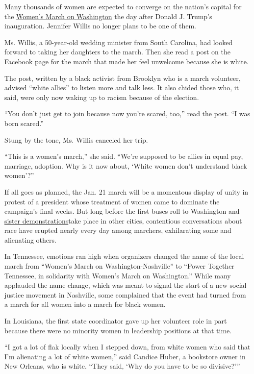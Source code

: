Many thousands of women are expected to converge on the nation's capital
for the
\href{https://www.nytimes.com/2016/11/19/us/womens-march-on-washington.html}{Women's
March on Washington} the day after Donald J. Trump's inauguration.
Jennifer Willis no longer plans to be one of them.

Ms. Willis, a 50-year-old wedding minister from South Carolina, had
looked forward to taking her daughters to the march. Then she read a
post on the Facebook page for the march that made her feel unwelcome
because she is white.

The post, written by a black activist from Brooklyn who is a march
volunteer, advised ``white allies'' to listen more and talk less. It
also chided those who, it said, were only now waking up to racism
because of the election.

``You don't just get to join because now you're scared, too,'' read the
post. ``I was born scared.''

Stung by the tone, Ms. Willis canceled her trip.

``This is a women's march,'' she said. ``We're supposed to be allies in
equal pay, marriage, adoption. Why is it now about, `White women don't
understand black women'?''

If all goes as planned, the Jan. 21 march will be a momentous display of
unity in protest of a president whose treatment of women came to
dominate the campaign's final weeks. But long before the first buses
roll to Washington and
\href{https://womensmarch.squarespace.com/sisters}{sister
demonstrations}take place in other cities, contentious conversations
about race have erupted nearly every day among marchers, exhilarating
some and alienating others.

In Tennessee, emotions ran high when organizers changed the name of the
local march from ``Women's March on Washington-Nashville'' to ``Power
Together Tennessee, in solidarity with Women's March on Washington.''
While many applauded the name change, which was meant to signal the
start of a new social justice movement in Nashville, some complained
that the event had turned from a march for all women into a march for
black women.

In Louisiana, the first state coordinator gave up her volunteer role in
part because there were no minority women in leadership positions at
that time.

``I got a lot of flak locally when I stepped down, from white women who
said that I'm alienating a lot of white women,'' said Candice Huber, a
bookstore owner in New Orleans, who is white. ``They said, `Why do you
have to be so divisive?'''

